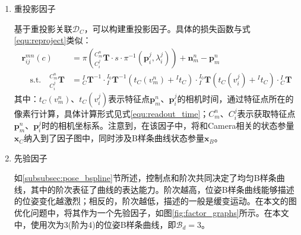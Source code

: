 \begin{enumerate}
  \item 重投影因子

        基于重投影关联$\mathcal{D}_{C}$，可以构建重投影因子。具体的损失函数与式\ref{equ:reproject}类似：
        \begin{equation}
          \begin{aligned}
            \boldsymbol{r}_{ij}^{mn}(c)      & =\pi\left({^{C_m^n}_{C_i^j}\boldsymbol{T}}\cdot s \cdot\pi^{-1}\left(\boldsymbol{p}_i^j,\lambda_i^j\right)\right) +\boldsymbol{n}_m^n-\boldsymbol{p}_m^n                                                         \\
            \quad\mathrm{s.t.}\quad
            {^{C_m^n}_{C_i^j}\boldsymbol{T}} & ={{^{I}_{C}}\boldsymbol{T}^{-1}}\cdot{{^{I_0}_{I}}\boldsymbol{T}^{-1}\left( t_{C}(v_m^n)+{^{I}t_C}\right) }\cdot{{^{I_0}_{I}}\boldsymbol{T}\left( t_{C}(v_i^j)+{^{I}t_C}\right) }\cdot{{^{I}_{C}}\boldsymbol{T}}
          \end{aligned}
        \end{equation}
        其中：$t_{C}(v_m^n)$、$t_{C}(v_i^j)$表示特征点$\boldsymbol{p}_m^n$、$\boldsymbol{p}_i^j$的相机时间，通过特征点所在的像素行计算，具体计算形式见式\ref{equ:readout_time}；${C_m^n}$、${C_i^j}$表示获取特征点$\boldsymbol{p}_m^n$、$\boldsymbol{p}_i^j$时的相机坐标系。注意到，在该因子中，将和Camera相关的状态参量$\boldsymbol{x}_C$纳入到了因子图中，同时涉及B样条曲线状态参量$\boldsymbol{x}_B$。

  \item 先验因子

        如\ref{subsubsec:pose_bspline}节所述，控制点和阶次共同决定了均匀B样条曲线，其中的阶次表征了曲线的表达能力。阶次越高，位姿B样条曲线能够描述的位姿变化越激烈；相反的，阶次越低，描述的一般是缓变运动。在本文的图优化问题中，将其作为一个先验因子，如图\ref{fig:factor_graphs}所示。在本文中，使用次为3(阶为4)的位姿B样条曲线，即$\mathcal{B}_d=3$。
\end{enumerate}

